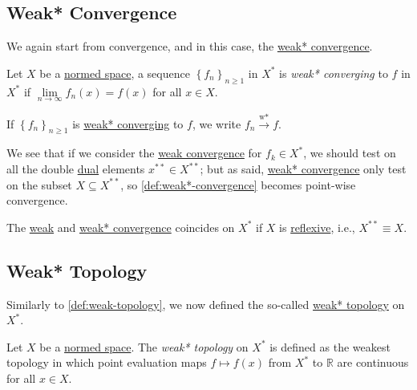 \subsection{Weak* Convergence}
We again start from convergence, and in this case, the \hyperref[def:weak*-convergence]{weak* convergence}.

\begin{definition}\label{def:weak*-convergence}
	Let \(X\) be a \hyperref[def:normed-vector-space]{normed space}, a sequence \(\left\{ f_{n} \right\}_{n\geq 1} \) in \(X^{\ast} \) is \emph{weak* converging} to \(f\) in \(X^{\ast}\) if \(\lim\limits_{n \to \infty} f_n(x) = f(x)\) for all \(x\in X\).
\end{definition}

\begin{notation}
	If \(\left\{ f_n \right\}_{n\geq 1} \) is \hyperref[def:weak*-convergence]{weak* converging} to \(f\), we write \(f_n \overset{\text{w*}}{\to } f\).
\end{notation}

We see that if we consider the \hyperref[def:weakly-convergence]{weak convergence} for \(f_k \in X^{\ast} \), we should test on all the double \hyperref[def:dual-space]{dual} elements \(x^{\ast\ast}\in X^{\ast\ast}\); but as said, \hyperref[def:weak*-convergence]{weak* convergence} only test on the subset \(X \subseteq X^{\ast\ast}\), so \autoref{def:weak*-convergence} becomes point-wise convergence.

\begin{remark}
	The \hyperref[def:weakly-convergence]{weak} and \hyperref[def:weak*-convergence]{weak* convergence} coincides on \(X^{\ast} \) if \(X\) is \hyperref[def:reflexive-space]{reflexive}, i.e., \(X^{\ast\ast} \equiv X\).
\end{remark}

\subsection{Weak* Topology}
Similarly to \autoref{def:weak-topology}, we now defined the so-called \hyperref[def:weak*-topology]{weak* topology} on \(X^{\ast} \).

\begin{definition}\label{def:weak*-topology}
	Let \(X\) be a \hyperref[def:normed-vector-space]{normed space}. The \emph{weak* topology} on \(X^{\ast} \) is defined as the weakest topology in which point evaluation maps \(f\mapsto f(x)\) from \(X^{\ast} \) to \(\mathbb{R} \) are continuous for all \(x\in X\).
\end{definition}

